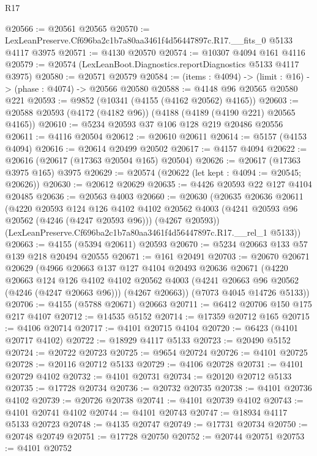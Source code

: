 \begin{lexlean}{R17}
\begin{coremodule}
@20566 := @20561 @20565
@20570 := LexLeanPreserve.Cf696ba2c1b7a80aa3461f4d56447897c.R17.__fits_0 @5133 @4117 @3975
@20571 := @4130 @20570
@20574 := @10307 @4094 @161 @4116
@20579 := @20574 (LexLeanBoot.Diagnostics.reportDiagnostics @5133 @4117 @3975)
@20580 := @20571 @20579
@20584 := (items : @4094) -> (limit : @16) -> (phase : @4074) -> @20566 @20580
@20588 := @4148 @96 @20565 @20580 @221
@20593 := @9852 (@10341 (@4155 (@4162 @20562) @4165))
@20603 := @20588 @20593 (@4172 (@4182 @96)) (@4188 (@4189 (@4190 @221) @20565 @4165))
@20610 := @5234 @20593 @37 @106 @128 @219 @20486 @20556
@20611 := @4116 @20504
@20612 := @20610 @20611
@20614 := @5157 (@4153 @4094)
@20616 := @20614 @20499 @20502
@20617 := @4157 @4094
@20622 := @20616 (@20617 (@17363 @20504 @165) @20504)
@20626 := @20617 (@17363 @3975 @165) @3975
@20629 := @20574 (@20622 (let kept : @4094 := @20545; @20626))
@20630 := @20612 @20629
@20635 := @4426 @20593 @22 @127 @4104 @20485
@20636 := @20563 @4003
@20660 := @20630
    (@20635
      @20636
      @20611
      (@4220
        @20593
        @124
        @126
        @4102
        @4102
        @20562
        @4003
        (@4241 @20593 @96 @20562 (@4246 (@4247 @20593 @96)))
        (@4267 @20593))
      (LexLeanPreserve.Cf696ba2c1b7a80aa3461f4d56447897c.R17.__rel_1 @5133))
@20663 := @4155 (@5394 @20611) @20593
@20670 := @5234 @20663 @133 @57 @139 @218 @20494 @20555
@20671 := @161 @20491
@20703 := @20670
    @20671
    @20629
    (@4966
      @20663
      @137
      @127
      @4104
      @20493
      @20636
      @20671
      (@4220
        @20663
        @124
        @126
        @4102
        @4102
        @20562
        @4003
        (@4241 @20663 @96 @20562 (@4246 (@4247 @20663 @96)))
        (@4267 @20663))
      (@7073 @4045 @14726 @5133))
@20706 := @4155 (@5788 @20671) @20663
@20711 := @6412 @20706 @150 @175 @217 @4107
@20712 := @14535 @5152
@20714 := @17359 @20712 @165
@20715 := @4106 @20714
@20717 := @4101 @20715 @4104
@20720 := @6423 (@4101 @20717 @4102)
@20722 := @18929 @4117 @5133
@20723 := @20490 @5152
@20724 := @20722 @20723
@20725 := @9654 @20724
@20726 := @4101 @20725
@20728 := @20116 @20712 @5133
@20729 := @4106 @20728
@20731 := @4101 @20729 @4102
@20732 := @4101 @20731
@20734 := @20120 @20712 @5133
@20735 := @17728 @20734
@20736 := @20732 @20735
@20738 := @4101 @20736 @4102
@20739 := @20726 @20738
@20741 := @4101 @20739 @4102
@20743 := @4101 @20741 @4102
@20744 := @4101 @20743
@20747 := @18934 @4117 @5133 @20723
@20748 := @4135 @20747
@20749 := @17731 @20734
@20750 := @20748 @20749
@20751 := @17728 @20750
@20752 := @20744 @20751
@20753 := @4101 @20752

\end{coremodule}
\end{lexlean}
